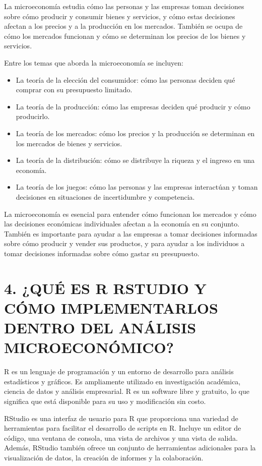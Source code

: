 \documentclass[
  spanish,
  12pt,
]{book}
\providecommand{\tightlist}{%
  \setlength{\itemsep}{0pt}\setlength{\parskip}{0pt}}
\begin{document}
La microeconomía estudia cómo las personas y las empresas toman
decisiones sobre cómo producir y consumir bienes y servicios, y cómo
estas decisiones afectan a los precios y a la producción en los
mercados. También se ocupa de cómo los mercados funcionan y cómo se
determinan los precios de los bienes y servicios.

Entre los temas que aborda la microeconomía se incluyen:

\begin{itemize}
\tightlist
\item
  La teoría de la elección del consumidor: cómo las personas deciden qué
  comprar con su presupuesto limitado.
\item
  La teoría de la producción: cómo las empresas deciden qué producir y
  cómo producirlo.
\item
  La teoría de los mercados: cómo los precios y la producción se
  determinan en los mercados de bienes y servicios.
\item
  La teoría de la distribución: cómo se distribuye la riqueza y el
  ingreso en una economía.
\item
  La teoría de los juegos: cómo las personas y las empresas interactúan
  y toman decisiones en situaciones de incertidumbre y competencia.
\end{itemize}

La microeconomía es esencial para entender cómo funcionan los mercados y
cómo las decisiones económicas individuales afectan a la economía en su
conjunto. También es importante para ayudar a las empresas a tomar
decisiones informadas sobre cómo producir y vender sus productos, y para
ayudar a los individuos a tomar decisiones informadas sobre cómo gastar
su presupuesto.

\chapter{4. ¿QUÉ ES R RSTUDIO Y CÓMO IMPLEMENTARLOS DENTRO DEL ANÁLISIS
MICROECONÓMICO?}\label{quuxe9-es-r-rstudio-y-cuxf3mo-implementarlos-dentro-del-anuxe1lisis-microeconuxf3mico}

R es un lenguaje de programación y un entorno de desarrollo para
análisis estadísticos y gráficos. Es ampliamente utilizado en
investigación académica, ciencia de datos y análisis empresarial. R es
un software libre y gratuito, lo que significa que está disponible para
su uso y modificación sin costo.

RStudio es una interfaz de usuario para R que proporciona una variedad
de herramientas para facilitar el desarrollo de scripts en R. Incluye un
editor de código, una ventana de consola, una vista de archivos y una
vista de salida. Además, RStudio también ofrece un conjunto de
herramientas adicionales para la visualización de datos, la creación de
informes y la colaboración.
\end{document}
